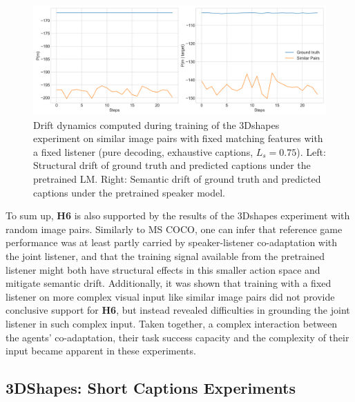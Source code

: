 \begin{figure}[h]
	\centering
	\includegraphics[width=\linewidth]{images/3dshapes_structural_semantic_drift_fixedListener_similarFixed_075.png}
	\caption{Drift dynamics computed during training of the 3Dshapes experiment on similar image pairs with fixed matching features with a fixed listener (pure decoding, exhaustive captions, $L_s = 0.75$). Left: Structural drift of ground truth and predicted captions under the pretrained LM. Right: Semantic drift of ground truth and predicted captions under the pretrained speaker model.}
	\label{fig:3dshapes_similarFixed_fixedListener_075_tr_sem_drift}
\end{figure}

To sum up, \textbf{H6} is also supported by the results of the 3Dshapes experiment with random image  pairs. Similarly to MS COCO, one can infer that reference game performance was at least partly carried by speaker-listener co-adaptation with the joint listener, and that the training signal available from the pretrained listener might both have structural effects in this smaller action space and mitigate semantic drift. 
Additionally, it was shown that training with a fixed listener on more complex visual input like similar image pairs did not provide conclusive support for \textbf{H6}, but instead revealed difficulties in grounding the joint listener in such complex input. Taken together, a complex interaction between the agents' co-adaptation, their task success capacity and the complexity of their input became apparent in these experiments.

\subsection{3DShapes: Short Captions Experiments}
\label{expt:3dshapes_short}

